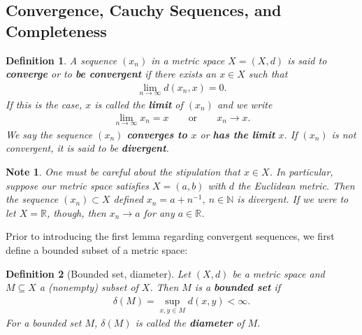 \documentclass[11pt]{article}
\theoremstyle{mystyle}
\newtheorem{defn}{Definition}[section]
\newtheorem{note}{Note}[section]
\newcommand{\0}{\mathbf{0}}
\begin{document}
\subsection{Convergence, Cauchy Sequences, and Completeness}\label{convergencemetric}

\begin{defn}
A sequence $(x_n)$ in a metric space $X=(X,d)$ is said to \textbf{converge} or to \textbf{be convergent} if there exists an $x \in X$ such that
\begin{align*}
    \lim_{n \to \infty} d(x_n, x) = 0.
\end{align*}
If this is the case, $x$ is called the \textbf{limit} of $(x_n)$ and we write \begin{align*}
    \lim_{n \to \infty} x_n = x \qquad \text{or} \qquad x_n \longrightarrow x.
\end{align*} 
We say the sequence $(x_n)$ \textbf{converges to $x$} or \textbf{has the limit} $x$. If $(x_n)$ is not convergent, it is said to be \textbf{divergent}.
\end{defn}

\begin{note}\label{notecompleteness}
One must be careful about the stipulation that $x \in X$. In particular, suppose our metric space satisfies $X = (a, b)$ with $d$ the Euclidean metric. Then the sequence $(x_n) \subset X$ defined $x_n = a + n^{-1}, \ n \in \mathbb{N}$ is divergent. If we were to let $X = \mathbb{R}$, though, then $x_n \longrightarrow a$ for any $a \in \mathbb{R}$.
\end{note}

Prior to introducing the first lemma regarding convergent sequences, we first define a bounded subset of a metric space:
\begin{defn}[Bounded set, diameter]
Let $(X, d)$ be a metric space and $M \subseteq X$ a (nonempty) subset of $X$. Then $M$ is a \textbf{bounded set} if
\begin{align*}
    \delta(M) = \sup_{x, y \in M}d(x, y) < \infty.
\end{align*}
For a bounded set $M$, $\delta(M)$ is called the \textbf{diameter} of $M$.
\end{defn}
\end{document}
